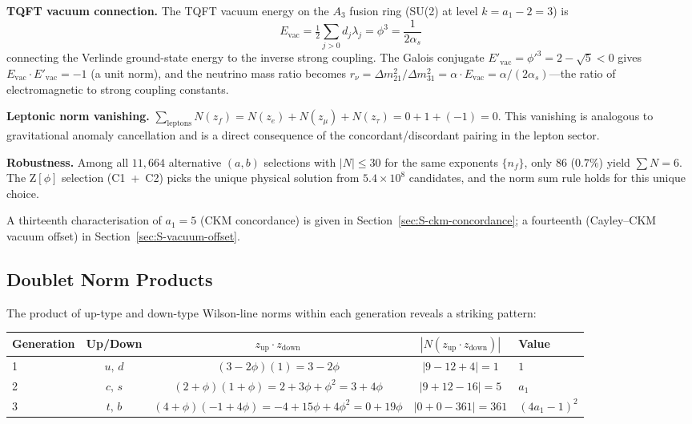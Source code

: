 \documentclass[12pt,a4paper]{article}
\theoremstyle{definition}
\begin{document}
\textbf{TQFT vacuum connection.}  The TQFT vacuum energy on the $A_3$ fusion ring (SU(2) at level $k = a_1 - 2 = 3$) is
\begin{equation}
E_{\text{vac}} = \tfrac{1}{2}\textstyle\sum_{j > 0} d_j \lambda_j = \phi^3 = \frac{1}{2\alpha_s}
\end{equation}
connecting the Verlinde ground-state energy to the inverse strong coupling.  The Galois conjugate $E'_{\text{vac}} = \phi'^3 = 2 - \sqrt{5} < 0$ gives $E_{\text{vac}} \cdot E'_{\text{vac}} = -1$ (a unit norm), and the neutrino mass ratio becomes $r_\nu = \Delta m^2_{21}/\Delta m^2_{31} = \alpha \cdot E_{\text{vac}} = \alpha/(2\alpha_s)$---the ratio of electromagnetic to strong coupling constants.

\textbf{Leptonic norm vanishing.}  $\sum_{\text{leptons}} N(z_f) = N(z_e) + N(z_\mu) + N(z_\tau) = 0 + 1 + (-1) = 0$.  This vanishing is analogous to gravitational anomaly cancellation and is a direct consequence of the concordant/discordant pairing in the lepton sector.

\textbf{Robustness.}  Among all $11{,}664$ alternative $(a,b)$ selections with $|N| \leq 30$ for the same exponents $\{n_f\}$, only $86$ ($0.7\%$) yield $\sum N = 6$.  The $\mathrm{Z}[\phi]$ selection (C1~+~C2) picks the unique physical solution from $5.4 \times 10^8$ candidates, and the norm sum rule holds for this unique choice.

A thirteenth characterisation of $a_1 = 5$ (CKM concordance) is given in Section~\ref{sec:S-ckm-concordance}; a fourteenth (Cayley--CKM vacuum offset) in Section~\ref{sec:S-vacuum-offset}.

\subsection{Doublet Norm Products}
\label{sec:S-doublet-norms}

The product of up-type and down-type Wilson-line norms within each generation reveals a striking pattern:

\begin{center}
\begin{tabular}{lcccl}
\toprule
\textbf{Generation} & \textbf{Up/Down} & $z_{\text{up}} \cdot z_{\text{down}}$ & $|N(z_{\text{up}} \cdot z_{\text{down}})|$ & \textbf{Value} \\
\midrule
1 & $u,\, d$ & $(3-2\phi)(1) = 3-2\phi$ & $|9 - 12 + 4| = 1$ & $1$ \\
2 & $c,\, s$ & $(2+\phi)(1+\phi) = 2+3\phi+\phi^2 = 3+4\phi$ & $|9+12-16| = 5$ & $a_1$ \\
3 & $t,\, b$ & $(4+\phi)(-1+4\phi) = -4+15\phi+4\phi^2 = 0 + 19\phi$ & $|0+0-361| = 361$ & $(4a_1-1)^2$ \\
\bottomrule
\end{tabular}
\end{center}
\end{document}
